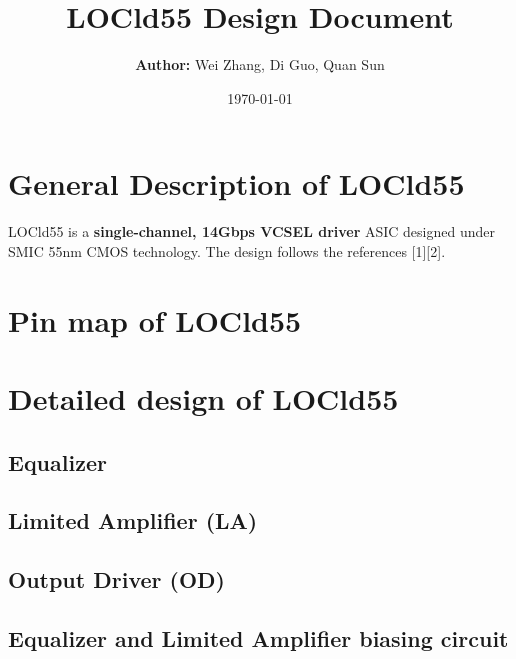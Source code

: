 \documentclass[15pt,a4paper]{article}
\title{\textbf{LOCld55 Design Document}}
\author{\textbf{Author:} Wei Zhang, Di Guo, Quan Sun}
\date{\today}
\begin{document}
\begin{spacing}{1.25}           %
\maketitle

\thispagestyle{empty}           %

\newpage

\tableofcontents                %

\thispagestyle{empty}           %

\newpage

\setcounter{page}{1}

\section{General Description of LOCld55}    %

LOCld55 is a \textbf{single-channel, 14Gbps VCSEL driver} ASIC designed under SMIC 55nm CMOS technology. The design follows the references [1][2].

\section{Pin map of LOCld55}                %

\section{Detailed design of LOCld55}        %
\subsection{Equalizer}

\subsection{Limited Amplifier (LA)}

\subsection{Output Driver (OD)}

\subsection{Equalizer and Limited Amplifier biasing circuit}


\end{spacing}
\end{document}
